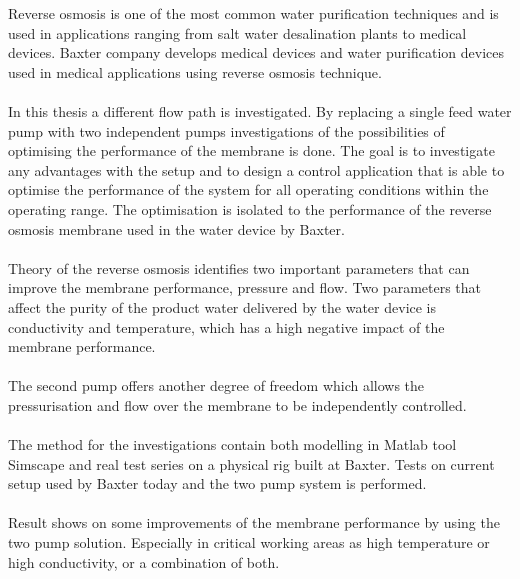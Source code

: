 
Reverse osmosis is one of the most common water purification techniques and is used in applications ranging from salt water desalination plants to medical devices. Baxter company develops medical devices and water purification devices used in medical applications using reverse osmosis technique. \\
\\
In this thesis a different flow path is investigated. By replacing a single feed water pump with two independent pumps investigations of the possibilities of optimising the performance of the membrane is done. The goal is to investigate any advantages with the setup and to design a control application that is able to optimise the performance of the system for all operating conditions within the operating range. The optimisation is isolated to the performance of the reverse osmosis membrane used in the water device by Baxter.\\
\\
Theory of the reverse osmosis identifies two important parameters that can improve the membrane performance, pressure and flow. Two parameters that affect the purity of the product water delivered by the water device is conductivity and temperature, which has a high negative impact of the membrane performance.\\
\\
The second pump offers another degree of freedom which allows the pressurisation and flow over the membrane to be independently controlled. \\
\\
The method for the investigations contain both modelling in Matlab tool Simscape and real test series on a physical rig built at Baxter. Tests on current setup used by Baxter today and the two pump system is performed. \\
\\
Result shows on some improvements of the membrane performance by using the two pump solution. Especially in critical working areas as high temperature or high conductivity, or a combination of both.\\ 
\\
 